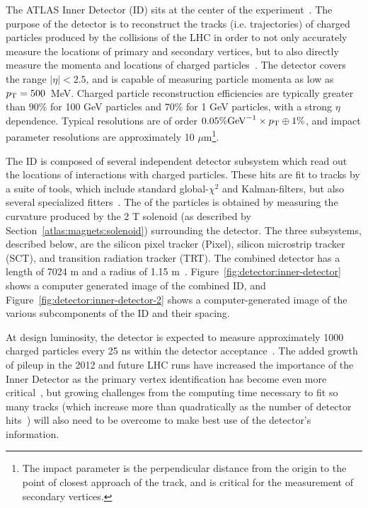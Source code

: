 The ATLAS Inner Detector (ID) sits at the center of the experiment~\cite{ATLASPaper}. The purpose of the detector is to reconstruct the tracks (i.e. trajectories) of charged particles produced by the collisions of the LHC in order to not only accurately measure the locations of primary and secondary vertices, but to also directly measure the momenta and locations of charged particles~\cite{ATLASExpected}. The detector covers the range $|\eta| < 2.5$, and is capable of measuring particle momenta as low as $p_{\text{T}} = 500$~MeV. Charged particle reconstruction efficiencies are typically greater than $90\%$ for 100 GeV particles and $70\%$ for 1 GeV particles, with a strong $\eta$ dependence. Typical \pT resolutions are of order $0.05\% \mathrm{GeV}^{-1} \times p_{\text{T}} \oplus 1\%$, and impact parameter resolutions are approximately 10 $\mu$m\footnote{The impact parameter is the perpendicular distance from the origin to the point of closest approach of the track, and is critical for the measurement of secondary vertices.}. 

The ID is composed of several independent detector subsystem which read out the locations of interactions with charged particles. These hits are fit to tracks by a suite of tools, which include standard global-$\chi^2$ and Kalman-filters, but also several specialized fitters~\cite{ATLASExpected}. The \pT of the particles is obtained by measuring the curvature produced by the 2 T solenoid (as described by Section~\ref{atlas:magnets:solenoid}) surrounding the detector. The three subsystems, described below, are the silicon pixel tracker (Pixel), silicon microstrip tracker (SCT), and transition radiation tracker (TRT). The combined detector has a length of 7024 m and a radius of 1.15 m~\cite{ATLASPaper}. Figure~\ref{fig:detector:inner-detector} shows a computer generated image of the combined ID, and Figure~\ref{fig:detector:inner-detector-2} shows a computer-generated image of the various subcomponents of the ID and their spacing.

At design luminosity, the detector is expected to measure approximately 1000 charged particles every 25 ns within the detector acceptance~\cite{ATLASExpected}. The added growth of pileup in the 2012 and future LHC runs have increased the importance of the Inner Detector as the primary vertex identification has become even more critical~\cite{ATLAS-CONF-2012-042}, but growing challenges from the computing time necessary to fit so many tracks (which increase more than quadratically as the number of detector hits~\cite{Combinatorics}) will also need to be overcome to make best use of the detector's information.

